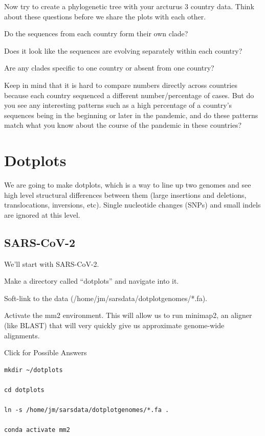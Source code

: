 \documentclass[
]{book}
\begin{document}
Now try to create a phylogenetic tree with your arcturus 3 country data. Think about these questions before we share the plots with each other.

Do the sequences from each country form their own clade?

Does it look like the sequences are evolving separately within each country?

Are any clades specific to one country or absent from one country?

Keep in mind that it is hard to compare numbers directly across countries because each country sequenced a different number/percentage of cases. But do you see any interesting patterns such as a high percentage of a country's sequences being in the beginning or later in the pandemic, and do these patterns match what you know about the course of the pandemic in these countries?

\hypertarget{dotplots}{%
\chapter{Dotplots}\label{dotplots}}

We are going to make dotplots, which is a way to line up two genomes and see high level structural differences between them (large insertions and deletions, translocations, inversions, etc). Single nucleotide changes (SNPs) and small indels are ignored at this level.

\hypertarget{sars-cov-2}{%
\section{SARS-CoV-2}\label{sars-cov-2}}

We'll start with SARS-CoV-2.

Make a directory called ``dotplots'' and navigate into it.

Soft-link to the data (/home/jm/sarsdata/dotplotgenomes/*.fa).

Activate the mm2 environment. This will allow us to run minimap2, an aligner (like BLAST) that will very quickly give us approximate genome-wide alignments.

Click for Possible Answers

\begin{verbatim}
mkdir ~/dotplots

cd dotplots

ln -s /home/jm/sarsdata/dotplotgenomes/*.fa .

conda activate mm2
\end{verbatim}
\end{document}
